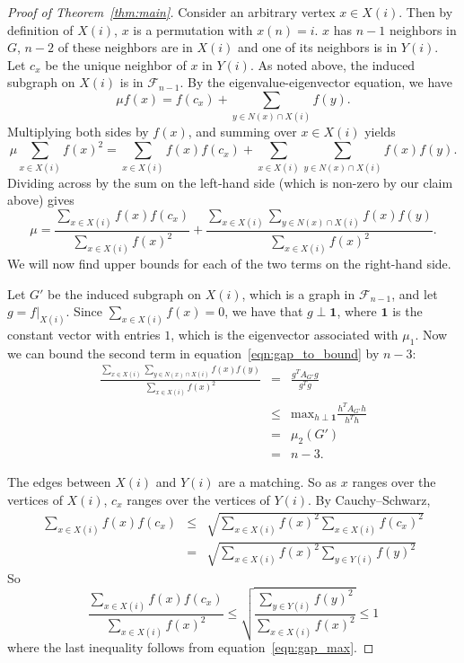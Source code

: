 \begin{proof}[Proof of Theorem~\ref{thm:main}]
  
  
  Consider an arbitrary vertex $x \in X(i)$.  Then by
  definition of $X(i)$, $x$
  is a permutation with $x(n) = i$.
  $x$ has $n-1$ neighbors in $G$, $n-2$ of these neighbors
  are in $X(i)$ and one of its neighbors is in $Y(i)$.
  Let $c_x$ be the unique neighbor of $x$ in $Y(i)$.
  As noted above, the induced subgraph on $X(i)$ is in $\mathcal{F}_{n-1}$.
  By the eigenvalue-eigenvector equation, we have
   \[ \mu f(x) = f(c_x) + \sum_{y \in N(x) \cap X(i)} f(y) .\]
  Multiplying both sides by $f(x)$, and summing over $x \in X(i)$
  yields
   \[ \mu \sum_{x \in X(i)} f(x)^2 = \sum_{x \in X(i)} f(x) f(c_x) + \sum_{x \in X(i)} \sum_{y \in N(x) \cap X(i)} f(x) f(y) .\]
  Dividing across by the sum on the left-hand side (which is non-zero 
  by our claim above) gives
   \begin{equation}\label{eqn:gap_to_bound}
     \mu = \frac{\sum_{x \in X(i)} f(x) f(c_x)}{\sum_{x \in X(i)} f(x)^2} + \frac{\sum_{x \in X(i)} \sum_{y \in N(x) \cap X(i)} f(x) f(y)}{\sum_{x \in X(i)} f(x)^2} .
    \end{equation}
  We will now find upper bounds for each of the two terms on
  the right-hand side.
  
  Let ${G'}$ be the induced subgraph on $X(i)$, which is a graph in $\mathcal{F}_{n-1}$, and let
  $g = f|_{X(i)}$.
  Since $\sum_{x \in X(i)} f(x)=0$, we have that $g \perp \textbf{1}$, where $\textbf{1}$ is the constant vector with entries $1$,
  which is the eigenvector associated with $\mu_1$.
  Now we can bound the second term in equation~\ref{eqn:gap_to_bound} by $n-3$:
     \begin{eqnarray*}
     \displaystyle \frac{\displaystyle\sum_{x \in X(i)} \displaystyle\sum_{y \in N(x) \cap X(i)} f(x) f(y)}{\displaystyle\sum_{x \in X(i)} f(x)^2} & = & \frac{g^T A_{G'} g}{ g^T g} \\
     &\leq& \text{max}_{h \perp \textbf{1}} \frac{h^T A_{G'} h}{h^T h} \\
     &=& \mu_2(G') \\
     &=& n-3.
   \end{eqnarray*}
 
 



   The edges between $X(i)$ and $Y(i)$ are a matching.
  So as $x$ ranges over the vertices of $X(i)$, $c_x$ ranges over
  the vertices of $Y(i)$.  By Cauchy--Schwarz,
   \begin{eqnarray*} 
   \sum_{x \in X(i)}f(x) f(c_x) & \leq & \sqrt{\sum_{x \in X(i)}f(x)^2 \sum_{x \in X(i)}f(c_x)^2 } \\
   & = & \sqrt{\sum_{x \in X(i)}f(x)^2 \sum_{y \in Y(i)}f(y)^2 } 
   \end{eqnarray*}
  So
   \[ \frac{\displaystyle \sum_{x \in X(i)} f(x) f(c_x)}{\displaystyle \sum_{x \in X(i)} f(x)^2} \leq \sqrt{\frac{\displaystyle \sum_{y \in Y(i)}f(y)^2}{\displaystyle {\sum_{x \in X(i)}f(x)^2}}} \leq 1 \]
  where the last inequality follows from equation~\ref{eqn:gap_max}.
   

\end{proof}
